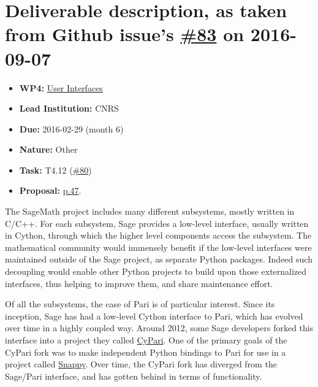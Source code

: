 \section*{\texorpdfstring{Deliverable description, as taken from Github
issue's
\href{https://github.com/OpenDreamKit/OpenDreamKit/issues/83}{\#83} on
2016-09-07}{Deliverable description, as taken from Github issue's \#83 on 2016-09-07}}\label{deliverable-description-as-taken-from-github-issues-83-on-2016-09-07}

\begin{itemize}
\tightlist
\item
  \textbf{WP4:}
  \href{https://github.com/OpenDreamKit/OpenDreamKit/tree/master/WP4}{User
  Interfaces}
\item
  \textbf{Lead Institution:} CNRS
\item
  \textbf{Due:} 2016-02-29 (month 6)
\item
  \textbf{Nature:} Other
\item
  \textbf{Task:} T4.12
  (\href{https://github.com/OpenDreamKit/OpenDreamKit/issues/80}{\#80})
\item
  \textbf{Proposal:}
  \href{https://github.com/OpenDreamKit/OpenDreamKit/raw/master/Proposal/proposal-www.pdf}{p.47}.
\end{itemize}

The SageMath project includes many different subsystems, mostly written
in C/C++. For each subsystem, Sage provides a low-level interface,
usually written in Cython, through which the higher level components
access the subsystem. The mathematical community would immensely benefit
if the low-level interfaces were maintained outside of the Sage project,
as separate Python packages. Indeed such decoupling would enable other
Python projects to build upon those externalized interfaces, thus
helping to improve them, and share maintenance effort.

Of all the subsystems, the case of Pari is of particular interest. Since
its inception, Sage has had a low-level Cython interface to Pari, which
has evolved over time in a highly coupled way. Around 2012, some Sage
developers forked this interface into a project they called
\href{https://bitbucket.org/t3m/cypari/}{CyPari}. One of the primary
goals of the CyPari fork was to make independent Python bindings to Pari
for use in a project called
\href{https://bitbucket.org/t3m/snappy}{Snappy}. Over time, the CyPari
fork has diverged from the Sage/Pari interface, and has gotten behind in
terms of functionality.

